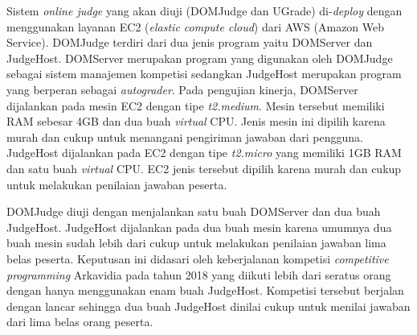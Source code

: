 \par Sistem \textit{online judge} yang akan diuji (DOMJudge dan UGrade) di-\textit{deploy} dengan menggunakan layanan EC2 (\textit{elastic compute cloud}) dari AWS (Amazon Web Service). DOMJudge terdiri dari dua jenis program yaitu DOMServer dan JudgeHost. DOMServer merupakan program yang digunakan oleh DOMJudge sebagai sistem manajemen kompetisi sedangkan JudgeHost merupakan program yang berperan sebagai \textit{autograder}. Pada pengujian kinerja, DOMServer dijalankan pada mesin EC2 dengan tipe \textit{t2.medium}. Mesin tersebut memiliki RAM sebesar 4GB dan dua buah \textit{virtual} CPU. Jenis mesin ini dipilih karena murah dan cukup untuk menangani pengiriman jawaban dari pengguna. JudgeHost dijalankan pada EC2 dengan tipe \textit{t2.micro} yang memiliki 1GB RAM dan satu buah \textit{virtual} CPU. EC2 jenis tersebut dipilih karena murah dan cukup untuk melakukan penilaian jawaban peserta.

\par DOMJudge diuji dengan menjalankan satu buah DOMServer dan dua buah JudgeHost. JudgeHost dijalankan pada dua buah mesin karena umumnya dua buah mesin sudah lebih dari cukup untuk melakukan penilaian jawaban lima belas peserta. Keputusan ini didasari oleh keberjalanan kompetisi \textit{competitive programming} Arkavidia pada tahun 2018 yang diikuti lebih dari seratus orang dengan hanya menggunakan enam buah JudgeHost. Kompetisi tersebut berjalan dengan lancar sehingga dua buah JudgeHost dinilai cukup untuk menilai jawaban dari lima belas orang peserta.

